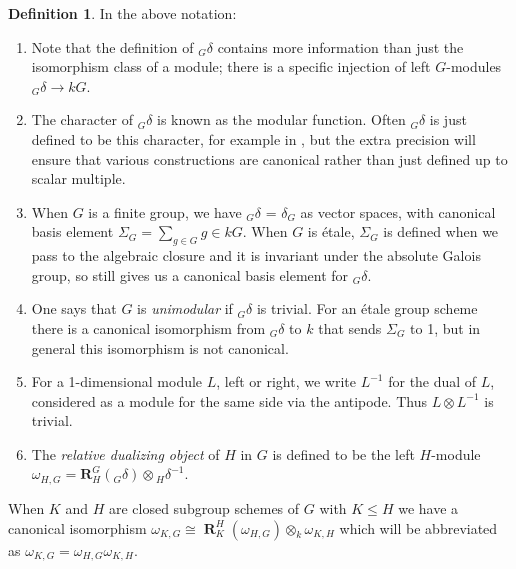 \documentclass[12pt]{amsart}
\theoremstyle{definition}
\newtheorem{definition}[theorem]{Definition}
\DeclareMathOperator{\res}{\mathbf{R}}
\begin{document}
\begin{definition}\label{def:delta}
In the above notation:

\begin{enumerate}

\item Note that the definition of ${}_G\delta$ contains more information than just the isomorphism class of a module; there is a specific injection of left $G$-modules ${}_G\delta \rightarrow kG$. 

\item The character of ${}_G\delta$ is known as the modular function. Often ${}_G\delta$ is just defined to be this character, for example in \cite[I.8.8]{MR2015057}, but the extra precision will ensure that various constructions are canonical rather than just defined up to scalar multiple.

\item When $G$ is a finite group, we have ${}_G\delta$ = $\delta_G$ as vector spaces, with canonical basis element  $\Sigma_G = \sum_{g\in G}g \in kG$. When $G$ is \'{e}tale, $\Sigma_G$ is defined when we pass to the algebraic closure and it is invariant under the absolute Galois group, so still gives us a canonical basis element for ${}_G\delta$.
 
\item One says that $G$ is {\em unimodular} if ${}_G\delta$ is trivial. For an  \'{e}tale  group scheme there is a canonical isomorphism from ${}_G\delta$ to $k$ that sends $\Sigma_G$ to 1, but in general this isomorphism is not canonical. 

\item For a 1-dimensional module $L$, left or right, we write $L^{-1}$ for the dual of $L$, considered as a module for the same side via the antipode. Thus $L \otimes L^{-1}$ is trivial.

\item The {\em relative dualizing object} of $H$ in $G$ is defined to be the left $H$-module $\omega _{H,G}=\mathbf{R}_H^G({}_G\delta) \otimes {}_H\delta^{-1}$. 
\end{enumerate}
\end{definition}



 When $K$ and $H$ are closed subgroup schemes of $G$ with $K\leq H$ we have a canonical isomorphism $\omega_{K,G} \cong \res^H_K(\omega_{H,G}) \otimes_k \omega_{K,H}$ which will be abbreviated as $
\omega_{K,G}=\omega_{H,G}\omega_{K,H}$.
\end{document}
